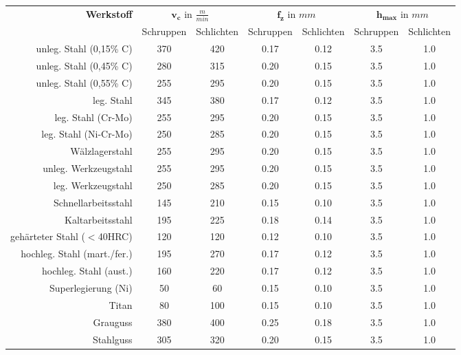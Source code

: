 \documentclass{\basedir/fablab-document}
\newcommand{\mcc}[1]{\multicolumn{2}{c}{#1}}
\begin{document}
\begin{table}
\setlength{\tabcolsep}{0.5em}

\begin{tabular}{rcccccc}
  \textbf{Werkstoff}  & \mcc{$\mathbf{v_c} \textrm{ in } \frac{m}{min} $} & \mcc{$\mathbf{f_z} \textrm{ in } mm$} & \mcc{$\mathbf{h_{max}} \textrm{ in } mm$} \\ \addlinespace \toprule
															& Schruppen 	& Schlichten 	& Schruppen 	& Schlichten 	& Schruppen 	& Schlichten		\\ \toprule
  unleg. Stahl (0,15\% C)			& 370 	& 420  	& 0.17 	& 0.12	& 3.5 	& 1.0 	\\
  unleg. Stahl (0,45\% C)			& 280 	& 315  	& 0.20 	& 0.15	& 3.5 	& 1.0 	\\
  unleg. Stahl (0,55\% C)			& 255 	& 295  	& 0.20 	& 0.15	& 3.5 	& 1.0 	\\
	leg. Stahl									& 345 	& 380  	& 0.17 	& 0.12	& 3.5 	& 1.0 	\\
	leg. Stahl (Cr-Mo)					& 255 	& 295  	& 0.20 	& 0.15	& 3.5 	& 1.0 	\\	
	leg. Stahl (Ni-Cr-Mo)				& 250 	& 285  	& 0.20 	& 0.15	& 3.5 	& 1.0 	\\
	Wälzlagerstahl							& 255 	& 295  	& 0.20 	& 0.15	& 3.5 	& 1.0 	\\
	unleg. Werkzeugstahl				& 255 	& 295  	& 0.20 	& 0.15	& 3.5 	& 1.0 	\\	
	leg. Werkzeugstahl					& 250 	& 285  	& 0.20 	& 0.15	& 3.5 	& 1.0 	\\	
	Schnellarbeitsstahl					& 145 	& 210  	& 0.15 	& 0.10	& 3.5 	& 1.0 	\\	
	Kaltarbeitsstahl						& 195 	& 225  	& 0.18 	& 0.14	& 3.5 	& 1.0 	\\	
	gehärteter Stahl ($<$40HRC)	& 120 	& 120  	& 0.12 	& 0.10	& 3.5 	& 1.0 	\\	
	hochleg. Stahl	(mart./fer.)& 195 	& 270  	& 0.17 	& 0.12	& 3.5 	& 1.0 	\\
	hochleg. Stahl	(aust.)			& 160 	& 220  	& 0.17 	& 0.12	& 3.5 	& 1.0 	\\
	Superlegierung (Ni)					& 50	 	& 60  	& 0.15 	& 0.10	& 3.5 	& 1.0 	\\
	Titan												& 80	 	& 100  	& 0.15 	& 0.10	& 3.5 	& 1.0 	\\
	Grauguss										& 380	 	& 400  	& 0.25 	& 0.18	& 3.5 	& 1.0 	\\
	Stahlguss										& 305	 	& 320  	& 0.20 	& 0.15	& 3.5 	& 1.0 	\\

\end{tabular}
\end{table}
\end{document}
